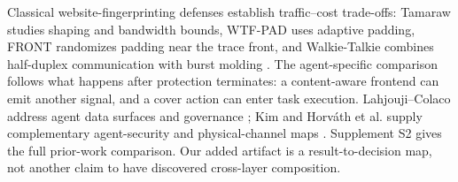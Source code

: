 Classical website-fingerprinting defenses establish traffic--cost trade-offs: Tamaraw studies shaping and bandwidth bounds, WTF-PAD uses adaptive padding, FRONT randomizes padding near the trace front, and Walkie-Talkie combines half-duplex communication with burst molding \cite{cai2014systematic,juarez2016wtfpad,gong2020front,wang2017walkietalkie}. The agent-specific comparison follows what happens after protection terminates: a content-aware frontend can emit another signal, and a cover action can enter task execution. Lahjouji--Colaco address agent data surfaces and governance \cite{lahjouji2026datacentric}; Kim and Horv\'ath et al. supply complementary agent-security and physical-channel maps \cite{kim2026agenticsok,horvath2024physical}. Supplement S2 gives the full prior-work comparison. Our added artifact is a result-to-decision map, not another claim to have discovered cross-layer composition.
